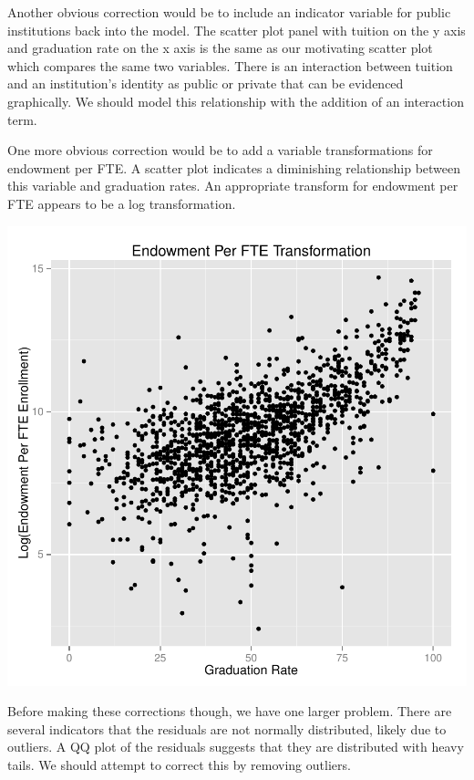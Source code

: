 \documentclass{article}
\begin{document}
Another obvious correction would be to include an indicator variable for public institutions back into the model. The scatter plot panel with tuition on the y axis and graduation rate on the x axis is the same as our motivating scatter plot which compares the same two variables. There is an interaction between tuition and an institution's identity as public or private that can be evidenced graphically. We should model this relationship with the addition of an interaction term.

One more obvious correction would be to add a variable transformations for endowment per FTE. A scatter plot indicates a diminishing relationship between this variable and graduation rates. An appropriate transform for endowment per FTE appears to be a log transformation.

\includegraphics{Fig-transforms}

\FloatBarrier

Before making these corrections though, we have one larger problem. There are several indicators that the residuals are not normally distributed, likely due to outliers. A QQ plot of the residuals suggests that they are distributed with heavy tails. We should attempt to correct this by removing outliers.
\end{document}
